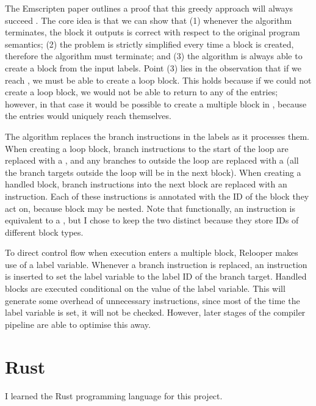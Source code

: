 \documentclass[00-main.tex]{subfiles}
\begin{document}
The Emscripten paper outlines a proof that this greedy approach will always succeed .
The core idea is that we can show that (1) whenever the algorithm terminates, the block it outputs is correct with respect to the original program semantics; (2) the problem is strictly simplified every time a block is created, therefore the algorithm must terminate; and (3) the algorithm is always able to create a block from the input labels.
Point (3) lies in the observation that if we reach , we must be able to create a loop block.
This holds because if we could not create a loop block, we would not be able to return to any of the entries; however, in that case it would be possible to create a multiple block in , because the entries would uniquely reach themselves.

The algorithm replaces the branch instructions in the labels as it processes them.
When creating a loop block, branch instructions to the start of the loop are replaced with a , and any branches to outside the loop are replaced with a  (all the branch targets outside the loop will be in the next block).
When creating a handled block, branch instructions into the next block are replaced with an  instruction.
Each of these instructions is annotated with the ID of the block they act on, because block may be nested.
Note that functionally, an  instruction is equivalent to a , but I chose to keep the two distinct because they store IDs of different block types.

To direct control flow when execution enters a multiple block, Relooper makes use of a label variable.
Whenever a branch instruction is replaced, an instruction is inserted to set the label variable to the label ID of the branch target.
Handled blocks are executed conditional on the value of the label variable.
This will generate some overhead of unnecessary instructions, since most of the time the label variable is set, it will not be checked.
However, later stages of the compiler pipeline are able to optimise this away.


\section{Rust}

I learned the Rust programming language  for this project.
\end{document}
